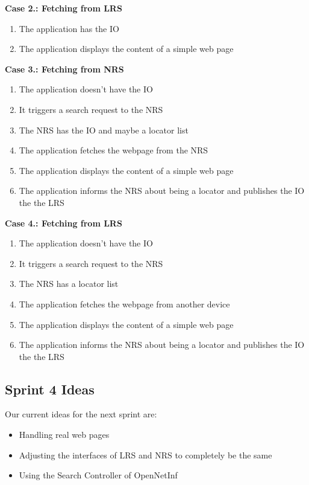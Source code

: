 \documentclass[a4paper,10pt]{article}
\begin{document}
 \textbf{Case 2.: Fetching from LRS}
 
 \begin{enumerate}
  \item The application has the IO
  \item The application displays the content of a simple web page
 \end{enumerate}

\textbf{Case 3.: Fetching from NRS}

 \begin{enumerate}
  \item The application doesn't have the IO
  \item It triggers a search request to the NRS
  \item The NRS has the IO and maybe a locator list
  \item The application fetches the webpage from the NRS
  \item The application displays the content of a simple web page
  \item The application informs the NRS about being a locator and publishes the IO the the LRS
 \end{enumerate}

\textbf{Case 4.: Fetching from LRS}
\begin{enumerate}
  \item The application doesn't have the IO
  \item It triggers a search request to the NRS
  \item The NRS has a locator list
  \item The application fetches the webpage from another device
  \item The application displays the content of a simple web page
  \item The application informs the NRS about being a locator and publishes the IO the the LRS
 \end{enumerate}

\subsection{Sprint 4 Ideas}
\label{sect:sprint4}
Our current ideas for the next sprint are:

\begin{itemize}
 \item Handling real web pages 
 \item Adjusting the interfaces of LRS and NRS to completely be the same
 \item Using the Search Controller of OpenNetInf
\end{itemize}
\end{document}
